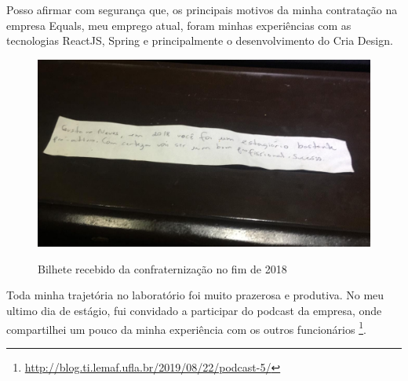 Posso afirmar com segurança que, os principais motivos da minha contratação na empresa Equals, meu emprego atual, foram minhas experiências com as tecnologias ReactJS, Spring e principalmente o desenvolvimento do Cria Design.

\begin{figure}[H]
\centering
\caption{Bilhete recebido da confraternização no fim de 2018} %

\includegraphics[scale=0.3]{agradecimento}\\  %
\label{fig:exemplo} %
\end{figure}

Toda minha trajetória no laboratório foi muito prazerosa e produtiva. No meu ultimo dia de estágio, fui convidado a participar do podcast da empresa, onde compartilhei um pouco da minha experiência com os outros funcionários \footnote{\url{http://blog.ti.lemaf.ufla.br/2019/08/22/podcast-5/}}.
